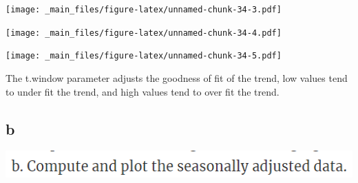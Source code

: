 \documentclass[]{book}
\newenvironment{Shaded}{\begin{snugshade}}{\end{snugshade}}
\newcommand{\DataTypeTok}[1]{\textcolor[rgb]{0.13,0.29,0.53}{#1}}
\newcommand{\DecValTok}[1]{\textcolor[rgb]{0.00,0.00,0.81}{#1}}
\newcommand{\KeywordTok}[1]{\textcolor[rgb]{0.13,0.29,0.53}{\textbf{#1}}}
\newcommand{\NormalTok}[1]{#1}
\newcommand{\OperatorTok}[1]{\textcolor[rgb]{0.81,0.36,0.00}{\textbf{#1}}}
\newcommand{\OtherTok}[1]{\textcolor[rgb]{0.56,0.35,0.01}{#1}}
\newcommand{\StringTok}[1]{\textcolor[rgb]{0.31,0.60,0.02}{#1}}
\begin{document}
\texttt{[image: \_main\_files/figure-latex/unnamed-chunk-34-3.pdf]}

\begin{Shaded}
\end{Shaded}

\texttt{[image: \_main\_files/figure-latex/unnamed-chunk-34-4.pdf]}

\begin{Shaded}
\end{Shaded}

\texttt{[image: \_main\_files/figure-latex/unnamed-chunk-34-5.pdf]}

The t.window parameter adjusts the goodness of fit of the trend, low values tend to under fit the trend, and high values tend to over fit the trend.

\hypertarget{b-3}{%
\subsection{b}\label{b-3}}

\includegraphics{./week2/6.6b.png}

\begin{Shaded}
\end{Shaded}
\end{document}
